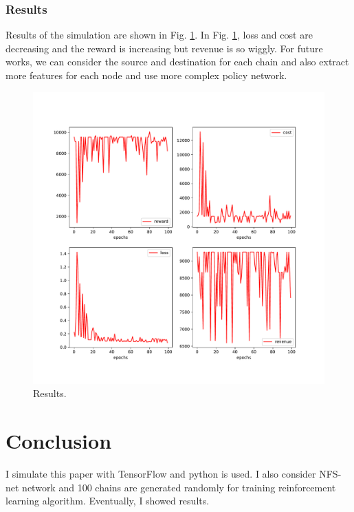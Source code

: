 \documentclass[12pt]{article}
\begin{document}
\subsubsection{Results}
Results of the simulation are shown in Fig. \ref{results}. In Fig. \ref{results}, loss and cost are decreasing and the reward is increasing but revenue is so wiggly. For future works, we can consider the source and destination for each chain and also extract more features for each node and use more complex policy network. 
\begin{figure}[t!]
	\label{results}
\includegraphics[scale=0.7]{results}
\caption{Results.}
\end{figure} 

\section{Conclusion}
I simulate this paper with TensorFlow and python is used. I also consider NFS-net network and 100 chains are generated randomly for training reinforcement learning algorithm. Eventually, I showed results. 
\clearpage



\end{document}
